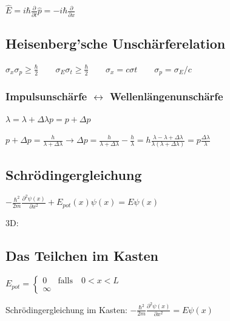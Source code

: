 \documentclass[10pt,a4paper]{scrartcl}
\begin{document}
\begin{multicols*}{3}
	$\hat{E}=i\hbar\frac{\partial}{\partial t}$\hfill$\hat{p}=-i\hbar\frac{\partial}{\partial x}$
	
	\subsection*{Heisenberg'sche Unschärferelation}

	$\sigma_x\sigma_p\geq\frac{\hbar}{2}\qquad\sigma_E\sigma_t\geq\frac{\hbar}{2}\qquad\sigma_x=c\sigma t\qquad\sigma_p=\sigma_E/c$
	
	\subsubsection{Impulsunschärfe $\leftrightarrow$ Wellenlängenunschärfe}
	
	$\lambda = \lambda + \Delta\lambda$\hfill$p=p+\Delta p$
	
	$p+\Delta p=\frac{h}{\lambda+\Delta\lambda}\rightarrow\Delta p=\frac{h}{\lambda+\Delta\lambda}-\frac{h}{\lambda}=h\frac{\lambda-\lambda+\Delta\lambda}{\lambda(\lambda+\Delta\lambda)}=p\frac{\Delta\lambda}{\lambda}$
	
	\subsection*{Schrödingergleichung}
	
	
	\finn
	
	$-\frac{\hbar^2}{2m}\frac{\partial^2\psi(x)}{\partial x^2}+E_{pot}(x)\psi(x)=E\psi(x)$
	
	\finn	
	
	3D: 
	
	\subsection*{Das Teilchen im Kasten}
	
	$E_{pot}=\begin{cases}
	0&\text{falls}\quad 0<x<L\\
	\infty%
	\end{cases}$
	
	Schrödingergleichung im Kasten: $-\frac{\hbar^2}{2m}\frac{\partial^2\psi(x)}{\partial x^2}=E\psi(x)$
	

\end{multicols*}
\end{document}
